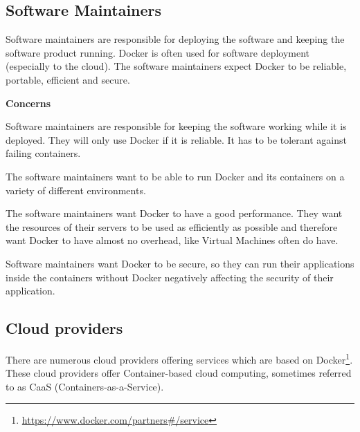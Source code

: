 \subsection*{Software Maintainers}
Software maintainers are responsible for deploying the software and keeping the software product running. Docker is often used for software deployment (especially to the cloud). %
The software maintainers expect Docker to be reliable, portable, efficient and secure.

\textbf{Concerns}
\begin{description}[labelwidth=6cm,labelindent=30pt,style=multiline,leftmargin=5.5cm,font=\normalfont\itshape]


\item[\textbf{Reliability}] Software maintainers are responsible for keeping the software working while it is deployed. They will only use Docker if it is reliable. It has to be tolerant against failing containers.

\item[\textbf{Portability}] The software maintainers want to be able to run Docker and its containers on a variety of different environments.

\item[\textbf{Performance efficiency}] The software maintainers want Docker to have a good performance. They want the resources of their servers to be used as efficiently as possible and therefore want Docker to have almost no overhead, like Virtual Machines often do have.

\item[\textbf{Security}] Software maintainers want Docker to be secure, so they can run their applications inside the containers without Docker negatively affecting the security of their application.

\end{description}



\subsection*{Cloud providers}
There are numerous cloud providers offering services which are based on Docker\footnote{\url{https://www.docker.com/partners\#/service}}. These cloud providers offer Container-based cloud computing, sometimes referred to as CaaS (Containers-as-a-Service).


